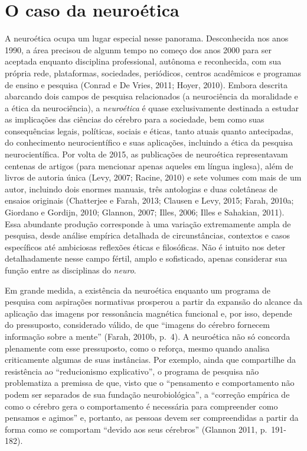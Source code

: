 \chapter{O caso da neuroética}

A neuroética ocupa um lugar especial nesse panorama. Desconhecida nos
anos 1990, a área precisou de algunm tempo no começo dos anos 2000 para
ser aceptada enquanto disciplina professional, autônoma e reconhecida,
com sua própria rede, plataformas, sociedades, periódicos, centros
acadêmicos e programas de ensino e pesquisa (Conrad e De Vries, 2011;
Hoyer, 2010). Embora descrita abarcando dois campos de pesquisa
relacionados (a neurociência da moralidade e a ética da neurociência), a
\emph{neuroética} é quase exclusivamente destinada a estudar as
implicações das ciências do cérebro para a sociedade, bem como suas
consequências legais, políticas, sociais e éticas, tanto atuais quanto
antecipadas, do conhecimento neurocientífico e suas aplicações,
incluindo a ética da pesquisa neurocientífica. Por volta de 2015, as
publicações de neuroética representavam centenas de artigos (para
mencionar apenas aqueles em língua inglesa), além de livros de autoria
única (Levy, 2007; Racine, 2010) e sete volumes com mais de um autor,
incluindo dois enormes manuais, três antologias e duas coletâneas de
ensaios originais (Chatterjee e Farah, 2013; Clausen e Levy, 2015;
Farah, 2010a; Giordano e Gordijn, 2010; Glannon, 2007; Illes, 2006;
Illes e Sahakian, 2011). Essa abundante produção corresponde à uma
variação extremamente ampla de pesquisa, desde análise empírica
detalhada de circunstâncias, contextos e casos específicos até
ambiciosas reflexões éticas e filosóficas. Não é intuito nos deter
detalhadamente nesse campo fértil, amplo e sofisticado, apenas
considerar sua função entre as disciplinas do \emph{neuro}.

Em grande medida, a existência da neuroética enquanto um programa de
pesquisa com aspirações normativas prosperou a partir da expansão do
alcance da aplicação das imagens por ressonância magnética funcional e,
por isso, depende do pressuposto, considerado válido, de que ``imagens
do cérebro fornecem informação sobre a mente'' (Farah, 2010b, p.~4). A
neuroética não só concorda plenamente com esse pressuposto, como o
reforça, mesmo quando analisa criticamente algumas de suas instâncias.
Por exemplo, ainda que compartilhe da resistência ao ``reducionismo
explicativo'', o programa de pesquisa não problematiza a premissa de
que, visto que o ``pensamento e comportamento não podem ser separados de
sua fundação neurobiológica'', a ``correção empírica de como o cérebro
gera o comportamento é necessária para compreender como pensamos e
agimos'' e, portanto, as pessoas devem ser compreendidas a partir da
forma como se comportam ``devido aos seus cérebros'' (Glannon 2011,
p.~191-182).

